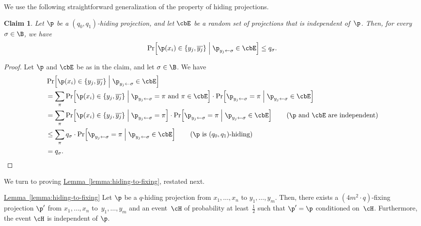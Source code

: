 \documentclass[11pt]{article}
\numberwithin{equation}{section}
\newtheorem{claim}[theorem]{Claim}
\theoremstyle{definition}
\theoremstyle{plain}
\newcommand{\expref}[2]{\hyperref[#2]{#1~\ref{#2}}}
\theoremstyle{definition}\newtheorem{notation}[theorem]{Notation}\theoremstyle{plain}
\begin{document}
We use the following straightforward generalization of the property
of hiding projections. 
\begin{claim}
\label{claim:generalized-hiding}Let $\p$ be a $(q_{0},q_{1})$-hiding
projection, and let $\cbE$ be a random set of projections that is
independent of~$\p$. Then, for every $\sigma\in\B$, we have
\[
\Pr\!\left[\p(x_{i})\in\left\{ y_{j},\overline{y_{j}}\right\} \;\middle|\;\p_{y_{j}\gets\sigma}\in\cbE\right]\le q_{\sigma}.
\]
\end{claim}
%
\begin{proof}
Let $\p$ and $\cbE$ be as in the claim, and let $\sigma\in\B$.
We have 
\begin{align*}
 & \Pr\!\left[\p(x_{i})\in\left\{ y_{j},\overline{y_{j}}\right\} \;\middle|\;\p_{y_{j}\gets\sigma}\in\cbE\right]\\
 & =\sum_{\pi}\Pr\!\left[\p(x_{i})\in\left\{ y_{j},\overline{y_{j}}\right\} \;\middle|\;\p_{y_{j}\gets\sigma}=\pi\text{~and~}\pi\in\cbE\right]\cdot\Pr\!\left[\p_{y_{j}\gets\sigma}=\pi\;\middle|\;\p_{y_{j}\gets\sigma}\in\cbE\right]\\
 & =\sum_{\pi}\Pr\!\left[\p(x_{i})\in\left\{ y_{j},\overline{y_{j}}\right\} \;\middle|\;\p_{y_{j}\gets\sigma}=\pi\right]\cdot\Pr\!\left[\p_{y_{j}\gets\sigma}=\pi\;\middle|\;\p_{y_{j}\gets\sigma}\in\cbE\right]\tag{\ensuremath{\p} and \ensuremath{\cbE} are independent}\\
 & \le\sum_{\pi}q_{\sigma}\cdot\Pr\!\left[\p_{y_{j}\gets\sigma}=\pi\;\middle|\;\p_{y_{j}\gets\sigma}\in\cbE\right]\tag{\ensuremath{\p} is \ensuremath{(q_{0},q_{1})}-hiding}\\
 & =q_{\sigma}.\qedhere
\end{align*}
\end{proof}

We turn to proving \expref{Lemma}{lemma:hiding-to-fixing},
restated next.
\begin{restated}{\expref{Lemma}{lemma:hiding-to-fixing}}
Let $\p$ be a $q$-hiding projection from $x_{1},\ldots,x_{n}$
to $y_{1},\ldots,y_{m}$. Then, there exists a $(4m^{2}\cdot q)$-fixing
projection $\p'$ from $x_{1},\ldots,x_{n}$ to~$y_{1},\ldots,y_{m}$
and an event~$\cH$ of probability at least~$\frac{1}{2}$ such
that $\p'=\p$ conditioned on~$\cH$. Furthermore, the event $\cH$
is independent of $\p$.
\end{restated}
\end{document}
